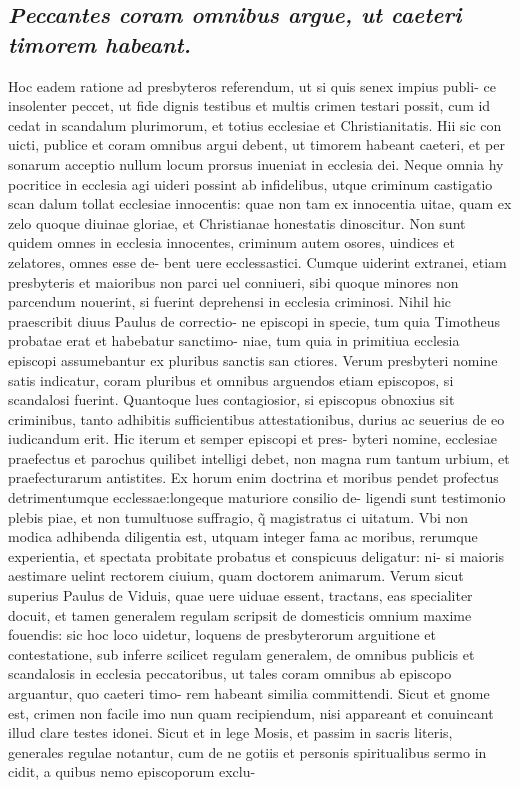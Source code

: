 \documentclass{article}
\begin{document}
\begin{pages}
\subsection*{\textit{Peccantes coram omnibus argue, ut caeteri timorem habeant. }}\pstart Hoc eadem ratione ad presbyteros referendum, ut si quis senex impius publi- ce insolenter peccet, ut fide dignis testibus et multis crimen testari possit, cum id cedat in scandalum plurimorum, et totius ecclesiae et Christianitatis. Hii sic con uicti, publice et coram omnibus argui debent, ut timorem habeant caeteri, et per sonarum acceptio nullum locum prorsus inueniat in ecclesia dei. Neque omnia hy pocritice in ecclesia agi uideri possint ab infidelibus, utque criminum castigatio scan dalum tollat ecclesiae innocentis: quae non tam ex innocentia uitae, quam ex zelo quoque  diuinae gloriae, et Christianae honestatis dinoscitur. Non sunt quidem omnes in ecclesia innocentes, criminum autem osores, uindices et zelatores, omnes esse de- bent uere ecclessastici. Cumque uiderint extranei, etiam presbyteris et maioribus non parci uel conniueri, sibi quoque minores non parcendum nouerint, si fuerint deprehensi in ecclesia criminosi. Nihil hic praescribit diuus Paulus de correctio- ne episcopi in specie, tum quia Timotheus probatae erat et habebatur sanctimo- niae, tum quia in primitiua ecclesia episcopi assumebantur ex pluribus sanctis san ctiores. Verum presbyteri nomine satis indicatur, coram pluribus et omnibus arguendos etiam episcopos, si scandalosi fuerint. Quantoque lues contagiosior, si episcopus obnoxius sit criminibus, tanto adhibitis sufficientibus attestationibus, durius ac seuerius de eo iudicandum erit. Hic iterum et semper episcopi et pres- byteri nomine, ecclesiae praefectus et parochus quilibet intelligi debet, non magna rum tantum urbium, et praefecturarum antistites. Ex horum enim doctrina et moribus pendet profectus detrimentumque ecclessae:longeque maturiore consilio de- ligendi sunt testimonio plebis piae, et non tumultuose suffragio, q̃ magistratus ci uitatum. Vbi non modica adhibenda diligentia est, utquam integer fama ac moribus, rerumque experientia, et spectata probitate probatus et conspicuus deligatur: ni- si maioris aestimare uelint rectorem ciuium, quam doctorem animarum. Verum sicut superius Paulus de Viduis, quae uere uiduae essent, tractans, eas specialiter docuit, et tamen generalem regulam scripsit de domesticis omnium maxime fouendis: sic hoc loco uidetur, loquens de presbyterorum arguitione et contestatione, sub inferre scilicet regulam generalem, de omnibus publicis et scandalosis in ecclesia peccatoribus, ut tales coram omnibus ab episcopo arguantur, quo caeteri timo- rem habeant similia committendi. Sicut et gnome est, crimen non facile imo nun quam recipiendum, nisi appareant et conuincant illud clare testes idonei. Sicut et in lege Mosis, et passim in sacris literis, generales regulae notantur, cum de ne gotiis et personis spiritualibus sermo in cidit, a quibus nemo episcoporum exclu-  \pend

\end{pages}
\end{document}

